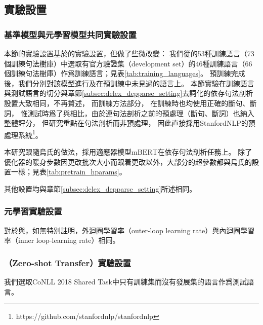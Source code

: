 \subsection{實驗設置}

\subsubsection{基準模型與元學習模型共同實驗設置}

本節的實驗設置基於\conll 的實驗設置，但做了些微改變：
我們從\conll 的53種訓練語言（73個訓練句法樹庫）中選取有官方驗證集（development set）的46種訓練語言（66個訓練句法樹庫）作爲訓練語言；見表\ref{tab:training_languages}。
預訓練完成後，我們分別對該模型進行\zeroshot 及\finetune 在預訓練中未見過的語言上。
本節實驗在訓練語言與測試語言的切分與章節\ref{subsec:delex_depparse_setting}去詞化的依存句法剖析設置大致相同，不再贅述，
而訓練方法部分，
在訓練時也均使用正確的斷句、斷詞，
惟測試時爲了與\conll 相比，由於\conll 連句法剖析之前的預處理（斷句、斷詞）也納入整體評分，
但研究重點在句法剖析而非預處理，
因此直接採用StanfordNLP的預處理系統\cite{qi-etal-2018-universal}\footnote{https://github.com/stanfordnlp/stanfordnlp}。


本研究跟隨烏氏的做法，採用適應器模型\finetune $\mathrm{mBERT}$在依存句法剖析任務上。
除了優化器的暖身步數因更改批次大小而跟着更改以外，大部分的超參數都與烏氏的設置一樣；見表\ref{tab:pretrain_hparams}。

其他設置均與章節\ref{subsec:delex_depparse_setting}所述相同。

\subsubsection{元學習實驗設置}

對於\reptile 與\fomaml ，如無特別註明，外迴圈學習率（outer-loop learning rate）與內迴圈學習率（inner loop-learning rate）相同。
\subsubsection{\zeroshot （Zero-shot Transfer）實驗設置}
我們選取CoNLL 2018 Shared Task中只有訓練集而沒有發展集的語言作爲測試語言。

